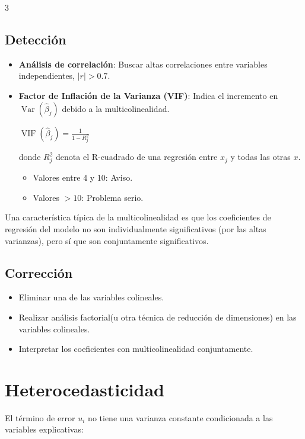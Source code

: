 \documentclass[10pt, a4paper, landscape]{article}
\DeclareMathOperator{\Var}{Var}
\begin{document}
\begin{multicols}{3}
\subsection*{Detección}

\begin{itemize}[leftmargin=*]
	\item \textbf{Análisis de correlación}: Buscar altas correlaciones entre variables independientes, \( \lvert r \rvert > 0.7 \).
	\item \textbf{Factor de Inflación de la Varianza (VIF)}: Indica el incremento en \( \Var(\hat{\beta}_{j}) \) debido a la multicolinealidad.
	\begin{center}
		\( \operatorname{VIF}(\hat{\beta}_{j}) = \frac{1}{1 - R_{j}^{2}} \)
	\end{center}
	donde \( R_{j}^{2} \) denota el R-cuadrado de una regresión entre \( x_{j} \) y todas las otras \( x \).
	\begin{itemize}[leftmargin=*]
		\item Valores entre 4 y 10: Aviso.
		\item Valores \( > 10 \): Problema serio.
	\end{itemize}
\end{itemize}

Una característica típica de la multicolinealidad es que los coeficientes de regresión del modelo no son individualmente significativos (por las altas varianzas), pero sí que son conjuntamente significativos.

\subsection*{Corrección}

\begin{itemize}[leftmargin=*]
	\item Eliminar una de las variables colineales.
	\item Realizar análisis factorial(u otra técnica de reducción de dimensiones) en las variables colineales.
	\item Interpretar los coeficientes con multicolinealidad conjuntamente.
\end{itemize}

\columnbreak

\section*{Heterocedasticidad}

El término de error \( u_{i} \) no tiene una varianza constante condicionada a las variables explicativas:


\end{multicols}
\end{document}
